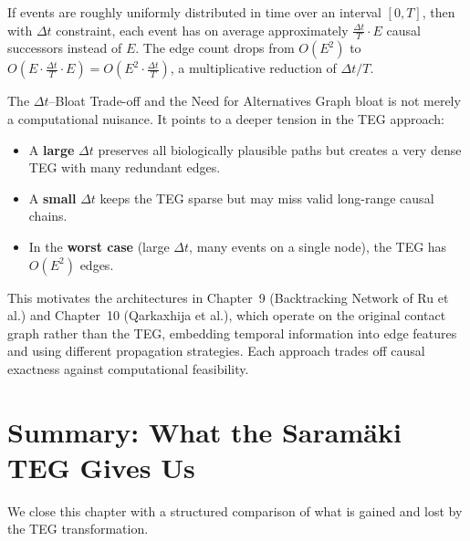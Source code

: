 If events are roughly uniformly distributed in time over an interval $[0, T]$,
then with $\Delta t$ constraint, each event has on average approximately
$\frac{\Delta t}{T} \cdot E$ causal successors instead of $E$. The edge count
drops from $O(E^2)$ to $O(E \cdot \frac{\Delta t}{T} \cdot E) = O(E^2 \cdot
\frac{\Delta t}{T})$, a multiplicative reduction of $\Delta t / T$.

\begin{keyinsight}{The $\Delta t$--Bloat Trade-off and the Need for Alternatives}
Graph bloat is not merely a computational nuisance. It points to a deeper
tension in the TEG approach:

\begin{itemize}[noitemsep]
    \item A \textbf{large} $\Delta t$ preserves all biologically plausible paths
          but creates a very dense TEG with many redundant edges.
    \item A \textbf{small} $\Delta t$ keeps the TEG sparse but may miss valid
          long-range causal chains.
    \item In the \textbf{worst case} (large $\Delta t$, many events on a single
          node), the TEG has $O(E^2)$ edges.
\end{itemize}

This motivates the architectures in Chapter~9 (Backtracking Network of Ru
et al.) and Chapter~10 (Qarkaxhija et al.), which operate on the original
contact graph rather than the TEG, embedding temporal information into edge
features and using different propagation strategies. Each approach trades
off causal exactness against computational feasibility.
\end{keyinsight}

\section{Summary: What the Saram\"{a}ki TEG Gives Us}
\label{sec:saramaki_summary}

We close this chapter with a structured comparison of what is gained and lost
by the TEG transformation.

